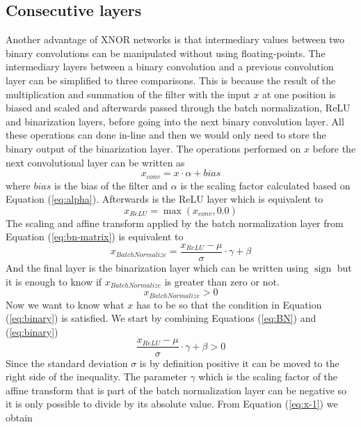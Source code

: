 \documentclass[conference]{IEEEtran}
\DeclareMathOperator{\sign}{sign}
\begin{document}
\subsection{Consecutive layers}
\label{sec:layers}

Another advantage of XNOR networks is that intermediary values between two binary convolutions can be manipulated without using floating-points. The intermediary layers between a binary convolution and a previous convolution layer can be simplified to three comparisons. This is because the result of the multiplication and summation of the filter with the input $x$ at one position is biased and scaled and afterwards passed through the batch normalization, ReLU and binarization layers, before going into the next binary convolution layer. All these operations can done in-line and then we would only need to store the binary output of the binarization layer. The operations performed on $x$ before the next convolutional layer can be written as
\begin{equation}
x_{\mathit{conv}} = x\cdot\alpha + \mathit{bias}
\label{eq:conv}
\end{equation}
where $\mathit{bias}$ is the bias of the filter and $\alpha$ is the scaling factor calculated based on Equation (\ref{eq:alpha}). Afterwards is the ReLU layer which is equivalent to 
\begin{equation}
x_{\mathit{ReLU}} = \max(x_{\mathit{conv}}, 0.0)
\label{eq:ReLU}
\end{equation}
The scaling and affine transform applied by the batch normalization layer from Equation (\ref{eq:bn-matrix}) is equivalent to
\begin{equation}
x_{\mathit{BatchNormalize}} = \frac{x_{\mathit{ReLU}} - \mu}{\sigma}\cdot\gamma + \beta
\label{eq:BN}
\end{equation}
And the final layer is the binarization layer which can be written using $\sign$ but it is enough to know if $x_{\mathit{BatchNormalize}}$ is greater than zero or not.
\begin{equation}
x_{\mathit{BatchNormalize}} > 0
\label{eq:binary}
\end{equation}
Now we want to know what $x$ has to be so that the condition in Equation (\ref{eq:binary}) is satisfied. We start by combining Equations (\ref{eq:BN}) and (\ref{eq:binary})
\begin{equation}
\frac{x_{\mathit{ReLU}} - \mu}{\sigma}\cdot\gamma + \beta > 0
\label{eq:x-1}
\end{equation}
Since the standard deviation $\sigma$ is by definition positive it can be moved to the right side of the inequality. The parameter $\gamma$ which is the scaling factor of the affine transform that is part of the batch normalization layer can be negative so it is only possible to divide by its absolute value. From Equation (\ref{eq:x-1}) we obtain
\end{document}
